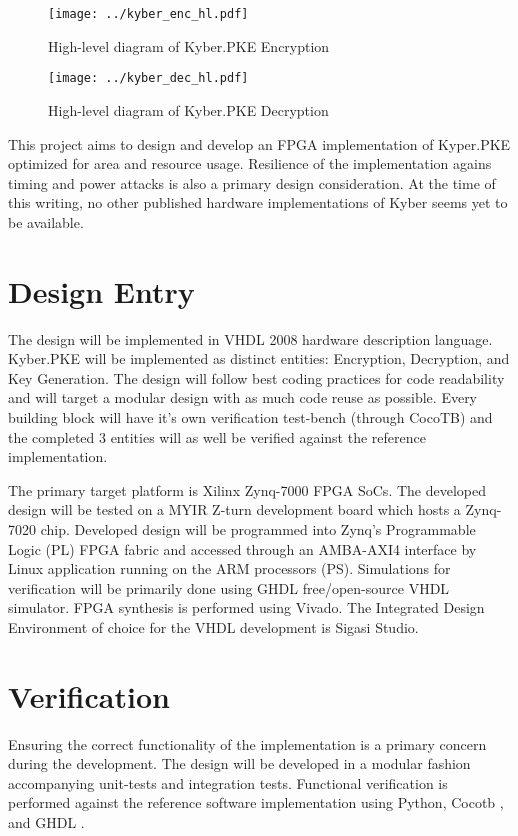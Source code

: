 \begin{figure}[h]
 \texttt{[image: ../kyber\_enc\_hl.pdf]}
 \caption{High-level diagram of Kyber.PKE Encryption}
 \label{fig:kyper_enc}
\end{figure}

\begin{figure}[h]
 \texttt{[image: ../kyber\_dec\_hl.pdf]} 
 \caption{High-level diagram of Kyber.PKE Decryption}
 \label{fig:kyper_dec}
\end{figure}  

This project aims to design and develop an FPGA implementation of Kyper.PKE optimized 
for area and resource usage. Resilience of the implementation agains timing and power
 attacks is also a primary design consideration. At the time of this writing, no other
  published hardware implementations of Kyber seems yet to be available.

  \chapter{Design Entry}
  The design will be implemented in VHDL 2008 hardware description language. Kyber.PKE 
  will be implemented as distinct entities: Encryption, Decryption, and Key Generation.
   The design will follow best coding practices for code readability and will target a 
   modular design with as much code reuse as possible. Every building block will have 
   it’s own verification test-bench (through CocoTB) and the completed 3 entities will 
   as well be verified against the reference implementation.


The primary target platform is Xilinx Zynq-7000 FPGA SoCs. The developed design will be
 tested on a MYIR Z-turn development board which hosts a Zynq-7020 chip. Developed design
  will be programmed into Zynq’s Programmable Logic (PL) FPGA fabric and accessed through 
  an AMBA-AXI4 interface by Linux application running on the ARM processors (PS). 
  Simulations for verification will be primarily done using GHDL free/open-source VHDL
   simulator.  FPGA synthesis is performed using Vivado. The Integrated Design Environment
    of choice for the VHDL development is Sigasi Studio.


\chapter{Verification}
Ensuring the correct functionality of the implementation is a primary concern during the 
development. The design will be developed in a modular fashion accompanying unit-tests 
and integration tests. Functional verification is performed against the reference 
software implementation using Python, Cocotb \cite{cocotb}
 , and GHDL \cite{ghdl}.

